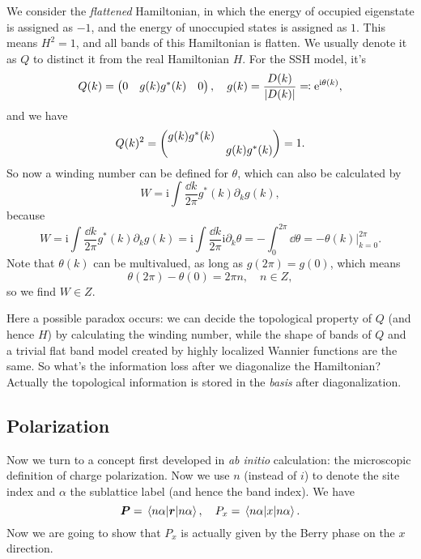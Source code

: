 \documentclass[hyperref, a4paper]{article}
\newcommand*{\ii}{\mathrm{i}}
\newcommand*{\ee}{\mathrm{e}}
\def\\{}%
\def\mathbb#1{#1}%
\begin{document}
We consider the \emph{flattened} Hamiltonian, in which the energy of occupied eigenstate is assigned as $-1$,
and the energy of unoccupied states is assigned as $1$. This means $H^2 = 1$, and all bands of this Hamiltonian
is flatten. We usually denote it as $Q$ to distinct it from the real Hamiltonian $H$. 
For the SSH model, it's 
\begin{equation}
    Q(k) = \pmqty{0 & g(k) \\ g^*(k) & 0}, \quad g(k) = \frac{D(k)}{\abs{D(k)}} \eqqcolon \ee^{\ii \theta(k)},
\end{equation}
and we have 
\begin{equation}
    Q(k)^2 = \pmqty{\dmat{g(k) g^*(k), g(k) g^*(k)}} = 1.
\end{equation}
So now a winding number can be defined for $\theta$, which can also be calculated by 
\begin{equation}
    W = \ii \int \frac{\dd{k}}{2\pi} g^*(k) \partial_k g(k) ,
\end{equation}
because 
\begin{equation}
    W= \ii \int \frac{\dd{k}}{2\pi} g^*(k) \partial_k g(k)  = \ii \int \frac{\dd{k}}{2\pi} \ii \partial_k \theta = - \int_0^{2\pi} \dd{\theta} = - \theta(k)|^{2\pi}_{k=0}.
\end{equation}
Note that $\theta(k)$ can be multivalued, as long as $g(2\pi) = g(0)$, which means
\[
    \theta(2\pi) - \theta(0) = 2\pi n , \quad n \in \mathbb{Z},
\]
so we find $W \in \mathbb{Z}$.

Here a possible paradox occurs: we can decide the topological property of $Q$ (and hence $H$) by calculating 
the winding number, while the shape of bands of $Q$ and a trivial flat band model created by highly localized 
Wannier functions are the same. So what's the information loss after we diagonalize the Hamiltonian?
Actually the topological information is stored in the \emph{basis} after diagonalization. 

\subsection{Polarization}

Now we turn to a concept first developed in \emph{ab initio} calculation: the microscopic definition of 
charge polarization. Now we use $n$ (instead of $i$) to denote the site index and $\alpha$ the sublattice label
(and hence the band index). We have 
\begin{equation}
    \vb*{P} = \expval{\vb*{r}}{n \alpha}, \quad P_x = \expval{x}{n \alpha}.
\end{equation}
Now we are going to show that $P_x$ is actually given by the Berry phase on the $x$ direction.
\end{document}

